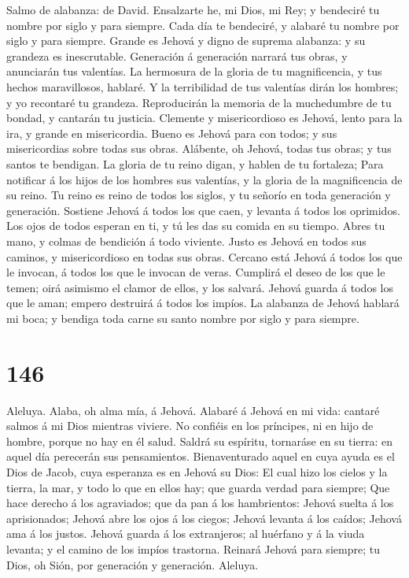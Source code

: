  Salmo de alabanza: de David. Ensalzarte he, mi Dios, mi
Rey; y bendeciré tu nombre por siglo y para siempre.  Cada
día te bendeciré, y alabaré tu nombre por siglo y para siempre.
 Grande es Jehová y digno de suprema alabanza: y su
grandeza es inescrutable.  Generación á generación narrará
tus obras, y anunciarán tus valentías.  La hermosura de la
gloria de tu magnificencia, y tus hechos maravillosos, hablaré.
 Y la terribilidad de tus valentías dirán los hombres; y
yo recontaré tu grandeza.  Reproducirán la memoria de la
muchedumbre de tu bondad, y cantarán tu justicia. 
Clemente y misericordioso es Jehová, lento para la ira, y grande en
misericordia.  Bueno es Jehová para con todos; y sus
misericordias sobre todas sus obras.  Alábente, oh
Jehová, todas tus obras; y tus santos te bendigan.  La
gloria de tu reino digan, y hablen de tu fortaleza;  Para
notificar á los hijos de los hombres sus valentías, y la gloria de la
magnificencia de su reino.  Tu reino es reino de todos
los siglos, y tu señorío en toda generación y generación.
 Sostiene Jehová á todos los que caen, y levanta á todos
los oprimidos.  Los ojos de todos esperan en ti, y tú les
das su comida en su tiempo.  Abres tu mano, y colmas de
bendición á todo viviente.  Justo es Jehová en todos sus
caminos, y misericordioso en todas sus obras.  Cercano
está Jehová á todos los que le invocan, á todos los que le invocan de
veras.  Cumplirá el deseo de los que le temen; oirá
asimismo el clamor de ellos, y los salvará.  Jehová
guarda á todos los que le aman; empero destruirá á todos los impíos.
 La alabanza de Jehová hablará mi boca; y bendiga toda
carne su santo nombre por siglo y para siempre.

\hypertarget{section-145}{%
\section{146}\label{section-145}}

 Aleluya. Alaba, oh alma mía, á Jehová. 
Alabaré á Jehová en mi vida: cantaré salmos á mi Dios mientras viviere.
 No confiéis en los príncipes, ni en hijo de hombre,
porque no hay en él salud.  Saldrá su espíritu, tornaráse
en su tierra: en aquel día perecerán sus pensamientos. 
Bienaventurado aquel en cuya ayuda es el Dios de Jacob, cuya esperanza
es en Jehová su Dios:  El cual hizo los cielos y la
tierra, la mar, y todo lo que en ellos hay; que guarda verdad para
siempre;  Que hace derecho á los agraviados; que da pan á
los hambrientos: Jehová suelta á los aprisionados;  Jehová
abre los ojos á los ciegos; Jehová levanta á los caídos; Jehová ama á
los justos.  Jehová guarda á los extranjeros; al huérfano
y á la viuda levanta; y el camino de los impíos trastorna.
 Reinará Jehová para siempre; tu Dios, oh Sión, por
generación y generación. Aleluya.

